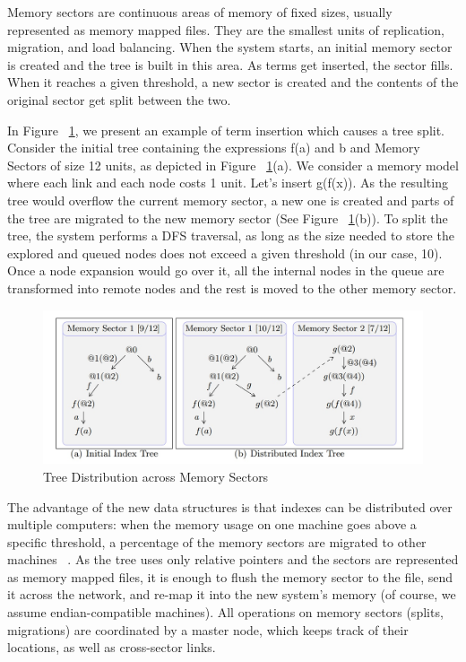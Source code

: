 \documentclass{deliverablereport}
\begin{document}
Memory sectors are continuous areas of memory of fixed sizes, usually represented as memory mapped files. They are the smallest units of replication, migration, and load balancing. When the system starts, an initial memory sector is created and the tree is built in this area. As terms get inserted, the sector fills. When it reaches a given threshold, a new sector is created and the contents of the original sector get split between the two. 

In Figure ~\ref{fig:memory_sectors}, we present an example of term insertion which causes a tree split. Consider the initial tree containing the expressions f(a) and b and Memory Sectors of size 12 units, as depicted in Figure ~\ref{fig:memory_sectors}(a). We consider a memory model where each link and each node costs 1 unit. Let’s insert g(f(x)). As the resulting tree would overflow the current memory sector, a new one is created and parts of the tree are migrated to the new memory sector (See Figure ~\ref{fig:memory_sectors}(b)). To split the tree, the system performs a DFS traversal, as long as the size needed to store the explored and queued nodes does not exceed a given threshold (in our case, 10). Once a node expansion would go over it, all the internal nodes in the queue are transformed into remote nodes and the rest is moved to the other memory sector. 

\begin{figure}[h]
\centering
 \includegraphics[scale=0.6]{figure4.jpg}
 \caption{Tree Distribution across Memory Sectors}
 \label{fig:memory_sectors}
\end{figure}

The advantage of the new data structures is that indexes can be distributed over multiple computers: when the memory usage on one machine goes above a specific threshold, a percentage of the memory sectors are migrated to other machines ~\cite{ProKoh:mwsofse11}. As the tree uses only relative pointers and the sectors are represented as memory mapped files, it is enough to flush the memory sector to the file, send it across the network, and re-map it into the new system’s memory (of course, we assume endian-compatible machines). All operations on memory sectors (splits, migrations) are coordinated by a master node, which keeps track of their locations, as well as cross-sector links. 
\end{document}

